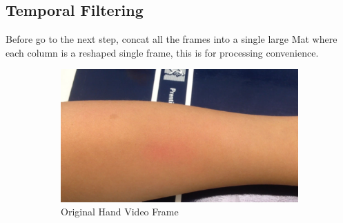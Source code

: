 \subsection{Temporal Filtering}
Before go to the next step, concat all the frames into a single large Mat where each column is a reshaped single frame, this is for processing convenience.
 \begin{figure}[!h]
\centering
\begin{subfigure}{.6\textwidth}
  \centering
  \includegraphics[scale=0.18]{img/eulerian/sample/test}
  \caption{Original Hand Video Frame}
  \label{fig:sub1}
\end{subfigure}%
\begin{subfigure}{.5\textwidth}
  \centering

\end{subfigure}
\end{figure}
